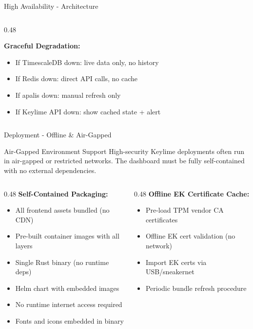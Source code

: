 \begin{frame}{High Availability - Architecture}
\begin{columns}[T]
\begin{column}{0.48\textwidth}
      \vspace{0.1cm}

      \textbf{Graceful Degradation:}
      \begin{itemize}
        \item If TimescaleDB down: live data only, no history
        \item If Redis down: direct API calls, no cache
        \item If apalis down: manual refresh only
        \item If Keylime API down: show cached state + alert
      \end{itemize}
    \end{column}
  \end{columns}
\end{frame}

\begin{frame}{Deployment - Offline \& Air-Gapped}
  \begin{block}{Air-Gapped Environment Support}
    \scriptsize
    High-security Keylime deployments often run in air-gapped or restricted networks.
    The dashboard must be fully self-contained with no external dependencies.
  \end{block}

  \vspace{0.2cm}

  \scriptsize
  \begin{columns}[T]
    \begin{column}{0.48\textwidth}
      \textbf{Self-Contained Packaging:}
      \begin{itemize}
        \setlength{\itemsep}{0pt}
        \item All frontend assets bundled (no CDN)
        \item Pre-built container images with all layers
        \item Single Rust binary (no runtime deps)
        \item Helm chart with embedded images
        \item No runtime internet access required
        \item Fonts and icons embedded in binary
      \end{itemize}
    \end{column}
    \begin{column}{0.48\textwidth}
      \textbf{Offline EK Certificate Cache:}
      \begin{itemize}
        \setlength{\itemsep}{0pt}
        \item Pre-load TPM vendor CA certificates
        \item Offline EK cert validation (no network)
        \item Import EK certs via USB/sneakernet
        \item Periodic bundle refresh procedure
      \end{itemize}


\end{column}
\end{columns}
\end{frame}
